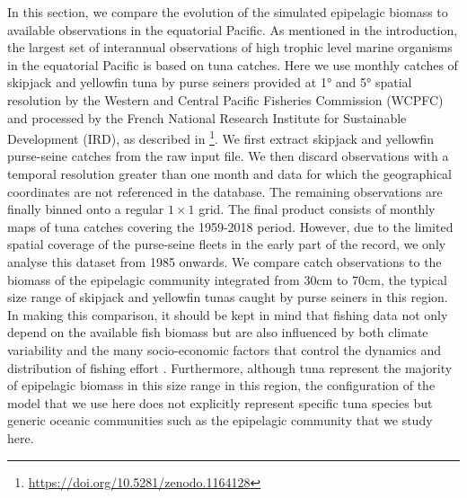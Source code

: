 In this section, we compare the evolution of the simulated epipelagic biomass to available observations in the equatorial Pacific. As mentioned in the introduction, the largest set of interannual observations of high trophic level marine organisms in the equatorial Pacific is based on tuna catches. Here we use monthly catches of skipjack and yellowfin tuna by purse seiners provided at 1° and 5° spatial resolution by the Western and Central Pacific Fisheries Commission (WCPFC) and processed by the French National Research Institute for Sustainable Development (IRD), as described in  \cite{taconetGlobalMonthlyCatch2018}\footnote{\url{https://doi.org/10.5281/zenodo.1164128}}. We first extract skipjack and yellowfin purse-seine catches from the raw input file. We then discard observations with a temporal resolution greater than one month and data for which the geographical coordinates are not referenced in the database. The remaining observations are finally binned onto a regular $1 \times 1$ grid. The final product consists of monthly maps of tuna catches covering the 1959-2018 period. However, due to the limited spatial coverage of the purse-seine fleets in the early part of the record, we only analyse this dataset from 1985 onwards. We compare catch observations to the biomass of the epipelagic community integrated from 30cm to 70cm, the typical size range of  skipjack and yellowfin tunas caught by purse seiners in this region. In making this comparison, it should be kept in mind that fishing data not only depend on the available fish biomass but are also influenced by both climate variability and the many socio-economic factors that control the dynamics and distribution of fishing effort \citep{hobdayDetectingClimateImpacts2013}. Furthermore, although tuna represent the majority of epipelagic biomass in this size range in this region, the configuration of the model that we use here does not explicitly represent specific tuna species but generic oceanic communities such as the epipelagic community that we study here.

